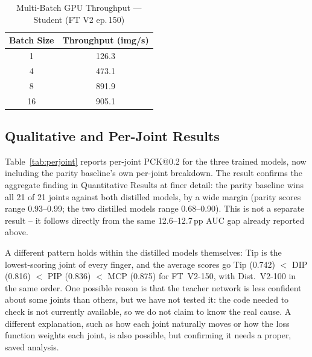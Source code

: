 \documentclass[11pt,conference,a4paper]{APSIPA2026}
\begin{document}
\begin{table}[!t]
\caption{Multi-Batch GPU Throughput --- Student (FT V2 ep.\,150)}
\label{tab:throughput}
\centering
\footnotesize
\setlength{\tabcolsep}{8pt}
\renewcommand{\arraystretch}{0.92}
\begin{tabular}{cc}
\toprule
\textbf{Batch Size} & \textbf{Throughput (img/s)} \\
\midrule
1  & 126.3 \\
4  & 473.1 \\
8  & 891.9 \\
16 & 905.1 \\
\bottomrule
\end{tabular}
\end{table}

\subsection{Qualitative and Per-Joint Results}
\label{sec:perjoint}

Table~\ref{tab:perjoint} reports per-joint PCK@0.2 for the three
trained models, now including the parity baseline's own per-joint
breakdown. The result confirms the aggregate finding in Quantitative
Results at finer detail: the parity baseline wins all 21 of 21
joints against both distilled models, by a wide margin (parity
scores range 0.93--0.99; the two distilled models range 0.68--0.90).
This is not a separate result -- it follows directly from the same
12.6--12.7\,pp AUC gap already reported above.

A different pattern holds within the distilled models themselves:
Tip is the lowest-scoring joint of every finger, and the average
scores go Tip (0.742) $<$ DIP (0.816) $<$ PIP (0.836) $<$ MCP
(0.875) for FT~V2-150, with Dist.\ V2-100 in the same order. One
possible reason is that the teacher network is less confident about
some joints than others, but we have not tested it: the code needed
to check is not currently available, so we do not claim to know the
real cause. A different explanation, such as how each
joint naturally moves or how the loss function weights each joint,
is also possible, but confirming it needs a proper, saved analysis.
\end{document}
